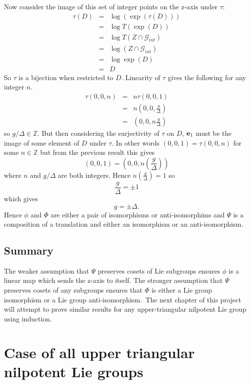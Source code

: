 \documentclass[honours]{UNSWthesis}
\newcommand{\Z}{\mathbb{Z}}
\newcommand{\G}{\mathcal{G}}
\newcommand{\1}{\mathbf{e}_{1}}
\newcommand{\2}{\mathbf{e}_{3}}
\newcommand{\3}{\mathbf{e}_{3}}
\begin{document}
Now consider the image of this set of integer points on the z-axis under $\tau$:
\begin{eqnarray*}
\tau(D)&=& \log(\exp (\tau(D))) \\
&=& \log T(\exp (D)) \\
&=& \log T(Z \cap \G_{int}) \\
&=& \log (Z \cap \G_{int}) \\
&=& \log \exp (D) \\
&=& D
\end{eqnarray*}
So $\tau$ is a bijection when restricted to $D$. Linearity of $\tau$ gives the following for any integer $n$.
\begin{eqnarray*}
\tau (0,0,n) &=& n \tau (0,0,1) \\
&=& n\left(0,0, \frac{g}{\Delta}\right) \\
&=& \left(0,0, n \frac{g}{\Delta}\right)
\end{eqnarray*}
so $g/\Delta \in \Z$. But then considering the surjectivity of $\tau$ on $D$, ${\bf e}_{1}$ must be the image of some element of $D$ under $\tau$. In other words $(0,0,1)=\tau(0,0,n)$ for some $n \in \Z$ but from the previous result this gives 
\[
(0,0,1)=\left(0,0, n\left(\frac{g}{\Delta}\right)\right)
\]
where $n$ and $g/\Delta$ are both integers. Hence $n \left( \frac{g}{\Delta}\right)=1$ so 
\[
\frac{g}{\Delta}= \pm 1
\]
which gives
\[
g=\pm \Delta.
\]
Hence $\phi$ and $\Phi$ are either a pair of isomorphisms or anti-isomorphims and $\Psi$ is a composition of a translation and either an isomorphism or an anti-isomorphism.

\section{Summary}
The weaker assumption that $\Psi$ preserves cosets of Lie subgroups ensures $\phi$ is a linear map which sends the z-axis to itself. The stronger assumption that $\Psi$ preserves cosets of any subgroups ensures that $\Phi$ is either a Lie group isomorphism or a Lie group anti-isomorphism.\
The next chapter of this project will attempt to prove similar results for any upper-triangular nilpotent Lie group using induction. 

\chapter{Case of all upper triangular nilpotent Lie groups}
\end{document}
